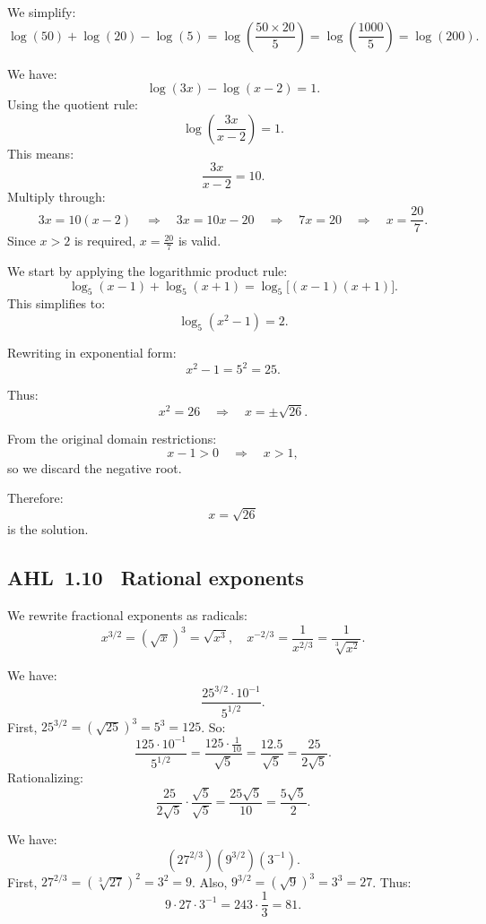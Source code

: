 \documentclass[11pt]{article}
\newcommand{\tocsubsection}[1]{\subsection{#1}}
\begin{document}
\begin{solution}
We simplify:
\[
\log(50) + \log(20) - \log(5) = \log\left(\frac{50 \times 20}{5}\right)
= \log\left(\frac{1000}{5}\right) = \log(200).
\]
\end{solution}


\begin{solution}
We have:
\[
\log(3x) - \log(x - 2) = 1.
\]
Using the quotient rule:
\[
\log\left(\frac{3x}{x - 2}\right) = 1.
\]
This means:
\[
\frac{3x}{x - 2} = 10.
\]
Multiply through:
\[
3x = 10(x - 2) \quad \Rightarrow \quad 3x = 10x - 20 \quad \Rightarrow \quad 7x = 20 \quad \Rightarrow \quad x = \frac{20}{7}.
\]
Since \(x > 2\) is required, \(x = \frac{20}{7}\) is valid.
\end{solution}


\begin{solution}
We start by applying the logarithmic product rule:
\[
\log_5(x - 1) + \log_5(x + 1) = \log_5\big[(x - 1)(x + 1)\big].
\]
This simplifies to:
\[
\log_5(x^2 - 1) = 2.
\]

Rewriting in exponential form:
\[
x^2 - 1 = 5^2 = 25.
\]

Thus:
\[
x^2 = 26 \quad\Rightarrow\quad x = \pm\sqrt{26}.
\]

From the original domain restrictions:
\[
x - 1 > 0 \quad\Rightarrow\quad x > 1,
\]
so we discard the negative root.

Therefore:
\[
\boxed{x = \sqrt{26}}
\]
is the solution.
\end{solution}


\tocsubsection{AHL 1.10 \; Rational exponents}

\begin{solution}
We rewrite fractional exponents as radicals:
\[
x^{3/2} = \left( \sqrt{x} \right)^3 = \sqrt{x^3}, 
\quad
x^{-2/3} = \frac{1}{x^{2/3}} = \frac{1}{\sqrt[3]{x^2}}.
\]
\end{solution}


\begin{solution}
We have:
\[
\frac{25^{3/2} \cdot 10^{-1}}{5^{1/2}}.
\]
First, \(25^{3/2} = (\sqrt{25})^3 = 5^3 = 125\).  
So:
\[
\frac{125 \cdot 10^{-1}}{5^{1/2}} = \frac{125 \cdot \frac{1}{10}}{\sqrt{5}} 
= \frac{12.5}{\sqrt{5}} = \frac{25}{2\sqrt{5}}.
\]
Rationalizing:
\[
\frac{25}{2\sqrt{5}} \cdot \frac{\sqrt{5}}{\sqrt{5}} = \frac{25\sqrt{5}}{10} = \frac{5\sqrt{5}}{2}.
\]
\end{solution}


\begin{solution}
We have:
\[
(27^{2/3})(9^{3/2})(3^{-1}).
\]
First, \(27^{2/3} = (\sqrt[3]{27})^2 = 3^2 = 9\).  
Also, \(9^{3/2} = (\sqrt{9})^3 = 3^3 = 27\).  
Thus:
\[
9 \cdot 27 \cdot 3^{-1} = 243 \cdot \frac{1}{3} = 81.
\]
\end{solution}
\end{document}
